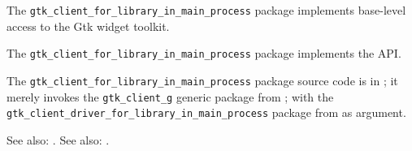 
The {\tt gtk\_client\_for\_library\_in\_main\_process} package implements base-level access to the Gtk widget 
toolkit.

The {\tt gtk\_client\_for\_library\_in\_main\_process} package implements the  API.

The {\tt gtk\_client\_for\_library\_in\_main\_process} package source code is in ; 
it merely invokes the {\tt gtk\_client\_g} generic package from 
; with the {\tt gtk\_client\_driver\_for\_library\_in\_main\_process} package from 
 as argument. 

See also:  .
See also:  .


